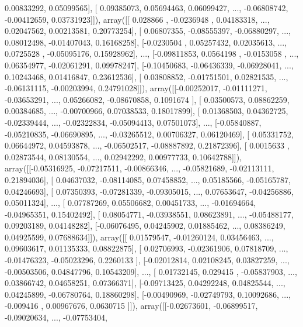 \documentclass{article}
\begin{document}
         0.00833292,  0.05099565],
       [ 0.09385073,  0.05694463,  0.06099427, ..., -0.06808742,
        -0.00412659,  0.03731923]]), array([[ 0.028866  , -0.0236948 ,  0.04183318, ...,  0.02047562,
         0.00213581,  0.20773254],
       [ 0.06807355, -0.08555397, -0.06880297, ...,  0.08012498,
        -0.01407043,  0.16168258],
       [-0.0230504 ,  0.05257432,  0.02035613, ...,  0.0725528 ,
        -0.05095176,  0.15928962],
       ..., 
       [-0.09811853,  0.0564198 , -0.0153058 , ...,  0.06354977,
        -0.02061291,  0.09978247],
       [-0.10450683, -0.06436339, -0.06928041, ...,  0.10243468,
         0.01416847,  0.23612536],
       [ 0.03808852, -0.01751501,  0.02821535, ..., -0.06131115,
        -0.00203994,  0.24791028]]), array([[-0.00252017, -0.01111271, -0.03653291, ...,  0.05266082,
        -0.08670858,  0.1091674 ],
       [ 0.03500573,  0.08862259,  0.00384685, ..., -0.00700966,
         0.07038533,  0.18017899],
       [ 0.01368503,  0.04362725, -0.02339444, ..., -0.02322834,
        -0.05094413,  0.07501073],
       ..., 
       [-0.05840887, -0.05210835, -0.06690895, ..., -0.03265512,
         0.00706327,  0.06120469],
       [ 0.05331752,  0.06644972,  0.04593878, ..., -0.06502517,
        -0.08887892,  0.21872396],
       [ 0.0015633 ,  0.02873544,  0.08130554, ...,  0.02942292,
         0.00977733,  0.10642788]]), array([[-0.05316925, -0.07217511, -0.00866346, ..., -0.05821689,
        -0.02113111,  0.21894036],
       [ 0.04637032, -0.08114085,  0.07458852, ...,  0.05185566,
        -0.05165787,  0.04246693],
       [ 0.07350393, -0.07281339, -0.09305015, ...,  0.07653647,
        -0.04256886,  0.05011324],
       ..., 
       [ 0.07787269,  0.05506682,  0.00451733, ..., -0.01694664,
        -0.04965351,  0.15402492],
       [ 0.08054771, -0.03938551,  0.08623891, ..., -0.05488177,
         0.09203189,  0.04148282],
       [-0.06076495,  0.04245902,  0.01885462, ...,  0.08386249,
         0.04925599,  0.07688634]]), array([[ 0.01579547, -0.01260124,  0.03456463, ...,  0.09603617,
         0.01135333,  0.08822875],
       [ 0.02706993, -0.02361906,  0.07818709, ..., -0.01476323,
        -0.05023296,  0.2260133 ],
       [-0.02012814,  0.02108245,  0.03827259, ..., -0.00503506,
         0.04847796,  0.10543209],
       ..., 
       [ 0.01732145,  0.029415  , -0.05837903, ...,  0.03866742,
         0.04658251,  0.07366371],
       [-0.09713425,  0.04292248,  0.04825544, ...,  0.04245899,
        -0.06780764,  0.18860298],
       [-0.00490969, -0.02749793,  0.10092686, ..., -0.009416  ,
         0.00967676,  0.0630715 ]]), array([[-0.02673601, -0.06899517, -0.09020634, ..., -0.07753404,
\end{document}
